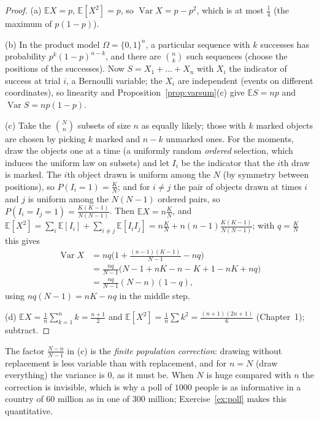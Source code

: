 \begin{proof}
(a) $\mathbb EX=p$, $\mathbb E[X^2]=p$, so $\operatorname{Var}X=p-p^2$, which is at most $\frac14$ (the maximum of $p(1-p)$).

(b) In the product model $\Omega=\{0,1\}^n$, a particular sequence with $k$ successes has probability $p^k(1-p)^{n-k}$, and there are $\binom nk$ such sequences (choose the positions of the successes). Now $S=X_1+\dots+X_n$ with $X_i$ the indicator of success at trial $i$, a Bernoulli variable; the $X_i$ are independent (events on different coordinates), so linearity and Proposition~\ref{prop:varsum}(c) give $\mathbb ES=np$ and $\operatorname{Var}S=np(1-p)$.

(c) Take the $\binom Nn$ subsets of size $n$ as equally likely; those with $k$ marked objects are chosen by picking $k$ marked and $n-k$ unmarked ones. For the moments, draw the objects one at a time (a uniformly random \emph{ordered} selection, which induces the uniform law on subsets) and let $I_i$ be the indicator that the $i$th draw is marked. The $i$th object drawn is uniform among the $N$ (by symmetry between positions), so $P(I_i=1)=\frac KN$; and for $i\ne j$ the pair of objects drawn at times $i$ and $j$ is uniform among the $N(N-1)$ ordered pairs, so $P(I_i=I_j=1)=\frac{K(K-1)}{N(N-1)}$. Then $\mathbb EX=n\frac KN$, and $\mathbb E[X^2]=\sum_i\mathbb E[I_i]+\sum_{i\ne j}\mathbb E[I_iI_j]=n\frac KN+n(n-1)\frac{K(K-1)}{N(N-1)}$; with $q=\frac KN$ this gives
\[
\begin{aligned}\operatorname{Var}X&=nq\Big(1+\frac{(n-1)(K-1)}{N-1}-nq\Big)\\&=\frac{nq}{N-1}\big(N-1+nK-n-K+1-nK+nq\big)\\&=\frac{nq}{N-1}(N-n)(1-q),\end{aligned}
\]
using $nq(N-1)=nK-nq$ in the middle step.

(d) $\mathbb EX=\frac1n\sum_{k=1}^nk=\frac{n+1}2$ and $\mathbb E[X^2]=\frac1n\sum k^2=\frac{(n+1)(2n+1)}6$ (Chapter~1); subtract.
\end{proof}

The factor $\frac{N-n}{N-1}$ in (c) is the \emph{finite population correction}: drawing without replacement is less variable than with replacement, and for $n=N$ (draw everything) the variance is $0$, as it must be. When $N$ is huge compared with $n$ the correction is invisible, which is why a poll of $1000$ people is as informative in a country of $60$ million as in one of $300$ million; Exercise~\ref{ex:poll} makes this quantitative.


